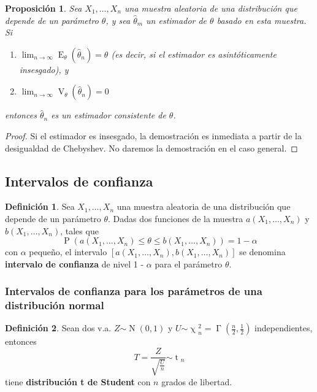 \documentclass[11pt]{article}
\theoremstyle{plain}
\newtheorem*{pro}{Proposición}
\theoremstyle{definition}
\newtheorem*{defi}{Definición}
\theoremstyle{remark}
\newcommand{\deft}[1]{\textbf{#1}}  %
\newcommand{\proba}{\ensuremath{\operatorname{P}}}  %
\newcommand{\esp}[0]{\ensuremath{\operatorname{E}}}  %
\newcommand{\var}[0]{\ensuremath{\operatorname{V}}}  %
\newcommand{\dists}[1]{\ensuremath{\operatorname{#1}}}  %
\newcommand{\dist}[1]{\ensuremath{\sim \operatorname{#1}}}  %
\begin{document}
      \begin{pro}
        Sea $X_1, \dots, X_n$ una muestra aleatoria de una distribución que depende de un parámetro $\theta$, y sea $\hat \theta_m$ un estimador de $\theta$ basado en esta muestra. Si
        \begin{enumerate}
          \item $\lim_{n \to \infty} \esp_\theta(\hat \theta_n) = \theta $ (es decir, si el estimador es asintóticamente insesgado), y
          \item $\lim_{n \to \infty} \var_\theta(\hat \theta_n) = 0$
        \end{enumerate}
        entonces $\hat \theta_n$ es un estimador consistente de $\theta$.
      \end{pro}
      \begin{proof}
        Si el estimador es insesgado, la demostración es inmediata a partir de la desigualdad de Chebyshev. No daremos la demostración en el caso general.
      \end{proof}

  \subsection{Intervalos de confianza}
    \begin{defi}
      Sea $X_1, \dots, X_n$ una muestra aleatoria de una distribución que depende de un parámetro $\theta$. Dadas dos funciones de la muestra $a(X_1,\dots,X_n)$ y $b(X_1,\dots,X_n)$, tales que
      \[ \proba(a(X_1,\dots,X_n) \leq \theta \leq b(X_1,\dots,X_n)) = 1 - \alpha \]
      con $\alpha$ pequeño, el intervalo $[a(X_1,\dots,X_n), b(X_1,\dots,X_n)]$ se denomina \deft{intervalo de confianza} de nivel 1 - $\alpha$ para el parámetro $\theta$.
    \end{defi}

    \subsubsection{Intervalos de confianza para los parámetros de una distribución normal}

      \begin{defi}
        Sean dos v.a. $Z \dist{N}(0,1)$ y $U\dist{\chi}_n^2 = \dists{\Gamma}\left( \frac{n}{2},\frac{1}{2} \right)$ independientes, entonces
        \[ T = \frac{Z}{\sqrt{\frac{U}{n}}} \dist{t}_n \]
        tiene \deft{distribución t de Student} con $n$ grados de libertad.
      \end{defi}
\end{document}
